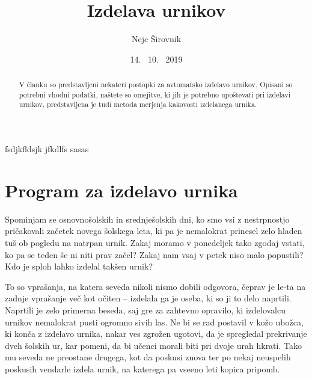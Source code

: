 \documentclass[a4paper, 10pt]{article}
\begin{document}

\title{Izdelava urnikov}
\author{Nejc Širovnik}
\date{14. \ 10. \ 2019}
\maketitle

{\theoremstyle{plain}
\newtheorem{izrek}{Izrek}
}


{\theoremstyle{definition}
\newtheorem{definicija}{Definicija}
}
fsdjkfldsjk jfkdlfs sasas
\begin{abstract}
   V članku so predstavljeni nekateri postopki za avtomatsko izdelavo urnikov. Opisani so
potrebni vhodni podatki, naštete so omejitve, ki jih je potrebno upoštevati pri izdelavi
urnikov, predstavljena je tudi metoda merjenja kakovosti izdelanega urnika.
\end{abstract}


\section{Program za izdelavo urnika} %

Spominjam se osnovnošolskih in srednješolskih dni, ko smo vsi z nestrpnostjo pričakovali
začetek novega šolskega leta, ki pa je nemalokrat prinesel zelo hladen tuš ob pogledu na
natrpan urnik. Zakaj moramo v ponedeljek tako zgodaj vstati, ko pa se teden še ni niti
prav začel? Zakaj nam vsaj v petek niso malo popustili? Kdo je sploh lahko izdelal
takšen urnik?

To so vprašanja, na katera seveda nikoli nismo dobili odgovora, čeprav je le-ta na zadnje
vprašanje več kot očiten -- izdelala ga je oseba, ki so ji to delo naprtili. Naprtili je
zelo primerna beseda, saj gre za zahtevno opravilo, ki izdelovalcu urnikov nemalokrat
pusti ogromno sivih las. Ne bi se rad postavil v kožo ubožca, ki konča z izdelavo urnika,
nakar ves zgrožen ugotovi, da je spregledal prekrivanje dveh šolskih ur, kar pomeni, da
bi učenci morali biti pri dvoje urah hkrati. Tako mu seveda ne preostane drugega, kot da
poskusi znova ter po nekaj neuspelih poskusih vendarle izdela urnik, na katerega pa vseeno
leti kopica pripomb.
\end{document}
